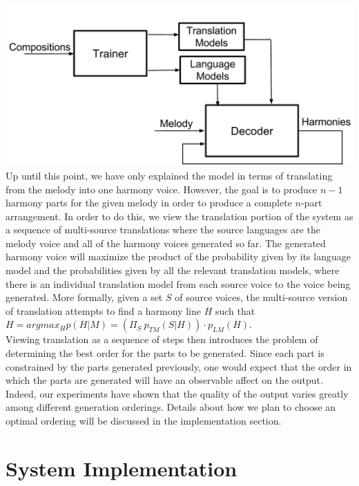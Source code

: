 \documentclass{sig-alternate}
\begin{document}
\includegraphics[scale=0.2]{design_overview.png}\\

Up until this point, we have only explained the model in terms of translating from the melody into one harmony voice. However, the goal is to produce $n - 1$ harmony parts for the given melody in order to produce a complete $n$-part arrangement. In order to do this, we view the translation portion of the system as a sequence of multi-source translations where the source languages are the melody voice and all of the harmony voices generated so far. The generated harmony voice will maximize the product of the probability given by its language model and the probabilities given by all the relevant translation models, where there is an individual translation model from each source voice to the voice being generated. More formally, given a set $S$ of source voices, the multi-source version of translation attempts to find a harmony line $H$ such that\\

$H = argmax_{H}p(H | M) = (\Pi_{S}\ p_{TM}(S | H)) \cdot p_{LM}(H)$.\\

Viewing translation as a sequence of steps then introduces the problem of determining the best order for the parts to be generated. Since each part is constrained by the parts generated previously, one would expect that the order in which the parts are generated will have an observable affect on the output. Indeed, our experiments have shown that the quality of the output varies greatly among different generation orderings. Details about how we plan to choose an optimal ordering will be discussed in the implementation section.

\section{System Implementation}
\label{sec:sys_implement}
\end{document}

